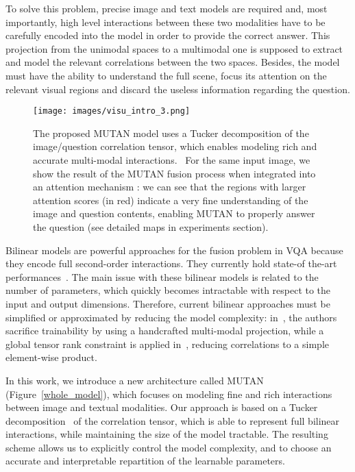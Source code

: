 \documentclass[10pt,twocolumn,letterpaper]{article}
\begin{document}
To solve this problem, precise image and text models are required and, most importantly, high level interactions between these two modalities have to be carefully encoded into the model in order to provide the correct answer.  
This projection from the unimodal spaces to a multimodal one is supposed to extract and model the relevant correlations between the two spaces. Besides, the model must have the ability to understand the full scene, focus its attention on the relevant visual regions and discard the useless information regarding the question.


\begin{figure}[htbp] 
\texttt{[image: images/visu\_intro\_3.png]}
\label{visu_intro}
\caption{
The proposed MUTAN model uses a Tucker decomposition of the image/question correlation tensor, which enables modeling rich and accurate multi-modal interactions.
~For the same input image, we show the result of the MUTAN fusion process when integrated into an attention mechanism \cite{icml2015_xuc15}: we can see that the regions with larger attention scores (in red) indicate a very fine understanding of the image and question contents,
enabling MUTAN to properly answer the question (see detailed maps in experiments section).}
\end{figure}

Bilinear models are powerful approaches for the fusion problem in VQA because they encode full second-order interactions. They currently hold state-of the-art performances~\cite{fukui16mcb, Kim2017}. 
The main issue with these bilinear models is related to the number of parameters, which quickly becomes intractable with respect to the input and output dimensions.
Therefore, current bilinear approaches must be simplified or approximated by reducing the model complexity: in~\cite{fukui16mcb}, the authors sacrifice trainability by using a handcrafted multi-modal projection, 
while a global  tensor rank constraint is applied in~\cite{Kim2017}, reducing correlations to a simple element-wise product.  

In this work, we introduce a new architecture called MUTAN (Figure~\ref{whole_model}), which focuses on modeling fine and rich interactions between image and textual modalities.  
Our approach is based on a Tucker decomposition~ \cite{Tucker1966} of the correlation tensor, which is able to represent full bilinear interactions, while maintaining the size of the model tractable. 
The resulting scheme allows us to explicitly control the model complexity, and to choose an accurate and interpretable repartition of the learnable parameters. 
\end{document}
